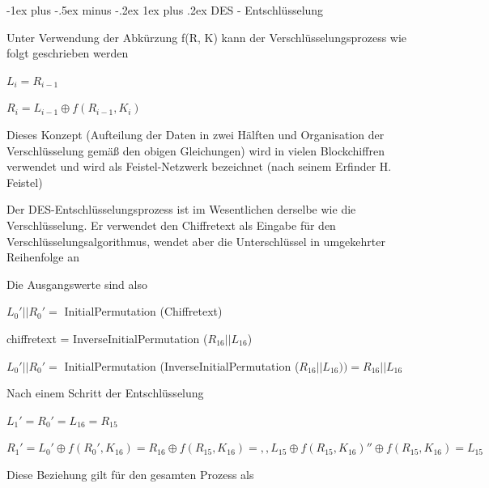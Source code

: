\documentclass[a4paper]{article}
\makeatletter
\renewcommand{\subsubsection}{\@startsection{subsubsection}{3}{0mm}%
 {-1ex plus -.5ex minus -.2ex}%
 {1ex plus .2ex}%
 {\normalfont\small\bfseries}}
\makeatother
\begin{document}
\begin{multicols}{3}
      \subsubsection{DES - Entschlüsselung}
      \begin{itemize*}
            \item Unter Verwendung der Abkürzung f(R, K) kann der Verschlüsselungsprozess wie folgt geschrieben werden
            \begin{itemize*}
                  \item $L_i = R_{i-1}$
                  \item $R_i = L_{i-1}\oplus f(R_{i-1}, K_i)$
                  \item Dieses Konzept (Aufteilung der Daten in zwei Hälften und Organisation der Verschlüsselung gemäß den obigen Gleichungen) wird in vielen Blockchiffren verwendet und wird als Feistel-Netzwerk bezeichnet (nach seinem Erfinder H. Feistel)
            \end{itemize*}
            \item Der DES-Entschlüsselungsprozess ist im Wesentlichen derselbe wie die Verschlüsselung. Er verwendet den Chiffretext als Eingabe für den Verschlüsselungsalgorithmus, wendet aber die Unterschlüssel in umgekehrter Reihenfolge an
            \item Die Ausgangswerte sind also
            \begin{itemize*}
                  \item $L_0' || R_0' =$ InitialPermutation (Chiffretext)
                  \item chiffretext = InverseInitialPermutation ($R_{16} || L_{16}$)
                  \item $L_0' || R_0' =$ InitialPermutation (InverseInitialPermutation ($R_{16}|| L_{16}))=R_{16}|| L_{16}$
            \end{itemize*}
            \item Nach einem Schritt der Entschlüsselung
            \begin{itemize*}
                  \item $L_1' = R_0' = L_{16} = R_{15}$
                  \item $R_1' = L_0' \oplus f(R_0', K_{16})=R_{16}\oplus f(R_{15},K_{16})=,,L_{15}\oplus f(R_{15},K_{16})''\oplus f(R_{15},K_{16}) =L_{15}$
            \end{itemize*}
            \item Diese Beziehung gilt für den gesamten Prozess als
            \begin{itemize*}

\end{itemize*}
\end{itemize*}
\end{multicols}
\end{document}
